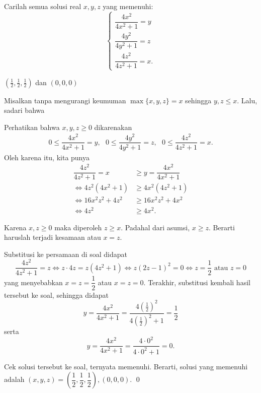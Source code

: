\documentclass[12pt]{scrartcl}
\begin{document}
	
	\begin{soalbaru} 
		 Carilah semua solusi real  $x,y,z$ yang memenuhi: 
		 		$$\begin{cases}
		 		\dfrac{4x^2}{4x^2+1}=y \\[5pt]
		 		\dfrac{4y^2}{4y^2+1}=z \\[5pt]
		 		\dfrac{4z^2}{4z^2+1}=x.
		 		\end{cases}$$
		 		
		 \begin{jawaban}
		 $(\frac12,\frac12,\frac12)$ dan $(0,0,0)$
		 \end{jawaban}
		 \begin{solusi}
		 Misalkan tanpa mengurangi keumuman $\max\{x,y,z\}=x$ sehingga $y,z \le x$. Lalu, sadari bahwa 
		 
		 Perhatikan bahwa $x,y,z \ge 0$ dikarenakan
		 \begin{equation*}
		 		 \begin{split}
		 		 0\le\dfrac{4x^2}{4x^2+1}=y,\text{  }
		 		 0\le\dfrac{4y^2}{4y^2+1}=z,\text{  }
		 		 0\le\dfrac{4z^2}{4z^2+1}=x.
		 		 \end{split}
		 \end{equation*}
		 Oleh karena itu, kita punya
		 \begin{equation*}
		 \begin{split}
		 \dfrac{4z^2}{4z^2+1}=x &\ge y=\dfrac{4x^2}{4x^2+1}\\
		 \iff 4z^2(4x^2+1) &\ge 4x^2(4z^2+1)\\
		 \iff 16x^2z^2+4z^2 &\ge 16x^2z^2 + 4x^2\\
		 \iff 4z^2 &\ge 4x^2.
		 \end{split}
		 \end{equation*}
		 
		 Karena $x,z \ge 0$ maka diperoleh $z \ge x$. Padahal dari asumsi, $x \ge z$. Berarti haruslah terjadi kesamaan atau $x=z$. 
		 
		 Substitusi ke persamaan di soal didapat
		 $$\dfrac{4z^2}{4z^2+1}=z \iff z\cdot 4z=z(4z^2+1) \iff z(2z-1)^2=0 \iff z=\dfrac{1}{2} \text{ atau } z=0 $$
		 yang menyebabkan $x=z=\dfrac{1}{2}$ atau $x=z=0$. Terakhir, substitusi kembali hasil tersebut ke soal, sehingga didapat
		 $$y=\dfrac{4x^2}{4x^2+1}=\dfrac{4(\frac{1}{2})^2}{4(\frac{1}{2})^2+1}=\dfrac{1}{2}$$ serta $$y=\dfrac{4x^2}{4x^2+1}=\dfrac{4\cdot 0^2}{4 \cdot 0^2 +1}=0.$$
		 
		 Cek solusi tersebut ke soal, ternyata memenuhi. Berarti, solusi yang memenuhi adalah $(x,y,z)=\left(\dfrac{1}{2},\dfrac{1}{2},\dfrac{1}{2}\right),(0,0,0)$. \qed
		 \end{solusi}
	\end{soalbaru}
\end{document}

